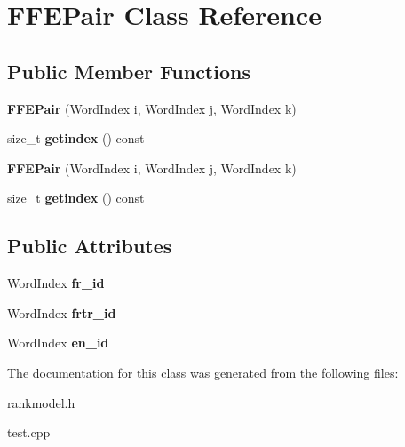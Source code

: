\hypertarget{classFFEPair}{\section{\-F\-F\-E\-Pair \-Class \-Reference}
\label{classFFEPair}
}
\subsection*{\-Public \-Member \-Functions}
\begin{DoxyCompactItemize}
\item 
\hypertarget{classFFEPair_a33a3e0265cca9e1707b063f6570455fe}{{\bfseries \-F\-F\-E\-Pair} (\-Word\-Index i, \-Word\-Index j, \-Word\-Index k)}\label{classFFEPair_a33a3e0265cca9e1707b063f6570455fe}

\item 
\hypertarget{classFFEPair_aa1e2ef33eede57173325cce3c14e90d6}{size\-\_\-t {\bfseries getindex} () const }\label{classFFEPair_aa1e2ef33eede57173325cce3c14e90d6}

\item 
\hypertarget{classFFEPair_a33a3e0265cca9e1707b063f6570455fe}{{\bfseries \-F\-F\-E\-Pair} (\-Word\-Index i, \-Word\-Index j, \-Word\-Index k)}\label{classFFEPair_a33a3e0265cca9e1707b063f6570455fe}

\item 
\hypertarget{classFFEPair_aa1e2ef33eede57173325cce3c14e90d6}{size\-\_\-t {\bfseries getindex} () const }\label{classFFEPair_aa1e2ef33eede57173325cce3c14e90d6}

\end{DoxyCompactItemize}
\subsection*{\-Public \-Attributes}
\begin{DoxyCompactItemize}
\item 
\hypertarget{classFFEPair_a8d4430bd66d486d35daf1c4d86434482}{\-Word\-Index {\bfseries fr\-\_\-id}}\label{classFFEPair_a8d4430bd66d486d35daf1c4d86434482}

\item 
\hypertarget{classFFEPair_a8d671aa4fe32070bda3c94722684d59c}{\-Word\-Index {\bfseries frtr\-\_\-id}}\label{classFFEPair_a8d671aa4fe32070bda3c94722684d59c}

\item 
\hypertarget{classFFEPair_af13fbda3d305e95ec2e518b33aae2d1f}{\-Word\-Index {\bfseries en\-\_\-id}}\label{classFFEPair_af13fbda3d305e95ec2e518b33aae2d1f}

\end{DoxyCompactItemize}


\-The documentation for this class was generated from the following files\-:\begin{DoxyCompactItemize}
\item 
rankmodel.\-h\item 
test.\-cpp\end{DoxyCompactItemize}
